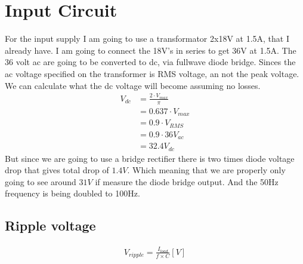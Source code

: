 \section{Input Circuit}
For the input supply I am going to use a transformator 2x18V at 1.5A, that I already have. I am going to connect the 18V's in series to get 36V at 1.5A.
The 36 volt ac are going to be converted to dc, via fullwave diode bridge. Sinces the ac voltage specified on the transformer is RMS voltage, an not the peak voltage. We can calculate what the dc voltage will become assuming no losses.
\begin{align} \label{eq:calc_vdc}
V_{ dc } &= \frac{ 2 \cdot V_{ max } }{ \pi } \\
         &= 0.637 \cdot V_{ max } \\
         &= 0.9 \cdot V_{ RMS } \\
         &= 0.9 \cdot 36 V_{ac} \nonumber \\
         &= 32.4 V_{ dc } \nonumber
\end{align}
But since we are going to use a bridge rectifier there is two times diode voltage drop that gives total drop of \(1.4V\). Which meaning that we are properly only going to see around \( 31V \) if measure the diode bridge output. And the 50Hz frequency is being doubled to 100Hz.

\subsection{Ripple voltage}

\begin{align}\label{eq:calc_vripple}
V_{ ripple } = \frac{ I_{ load } }{ f \times C } [V]
\end{align}
